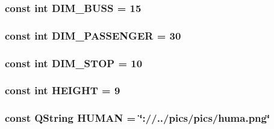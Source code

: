 \hypertarget{actoritem_8hh_a0206546ca28fb9fca0c00861c5843dd5}{
\subsubsection[{D\-I\-M\-\_\-\-B\-U\-S\-S}]{\setlength{\rightskip}{0pt plus 5cm}const int D\-I\-M\-\_\-\-B\-U\-S\-S = 15}}\label{actoritem_8hh_a0206546ca28fb9fca0c00861c5843dd5}
\hypertarget{actoritem_8hh_a94bb4115dc75d86789f2424ba4efcbdc}{
\subsubsection[{D\-I\-M\-\_\-\-P\-A\-S\-S\-E\-N\-G\-E\-R}]{\setlength{\rightskip}{0pt plus 5cm}const int D\-I\-M\-\_\-\-P\-A\-S\-S\-E\-N\-G\-E\-R = 30}}\label{actoritem_8hh_a94bb4115dc75d86789f2424ba4efcbdc}
\hypertarget{actoritem_8hh_abd028a1a48c574e726a4a904fff0a08c}{
\subsubsection[{D\-I\-M\-\_\-\-S\-T\-O\-P}]{\setlength{\rightskip}{0pt plus 5cm}const int D\-I\-M\-\_\-\-S\-T\-O\-P = 10}}\label{actoritem_8hh_abd028a1a48c574e726a4a904fff0a08c}
\hypertarget{actoritem_8hh_af728b7647e0b8c49832983a31f9a2e9b}{
\subsubsection[{H\-E\-I\-G\-H\-T}]{\setlength{\rightskip}{0pt plus 5cm}const int H\-E\-I\-G\-H\-T = 9}}\label{actoritem_8hh_af728b7647e0b8c49832983a31f9a2e9b}
\hypertarget{actoritem_8hh_a919ee1b297d205cded0f0dc03ade1cfd}{
\subsubsection[{H\-U\-M\-A\-N}]{\setlength{\rightskip}{0pt plus 5cm}const Q\-String H\-U\-M\-A\-N = \char`\"{}\-://../pics/pics/huma.\-png\char`\"{}}}\label{actoritem_8hh_a919ee1b297d205cded0f0dc03ade1cfd}


